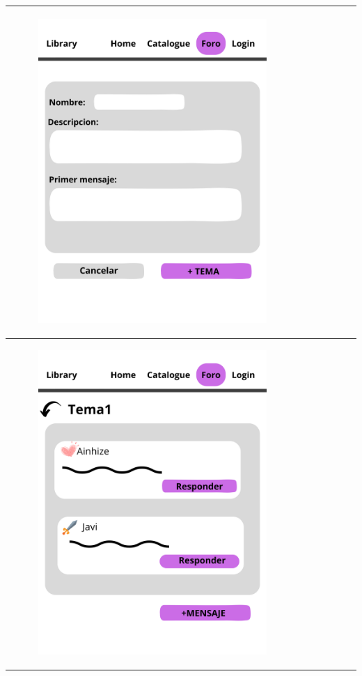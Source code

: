 \documentclass{report}
\begin{document}
\begin{center}
\begin{longtable}{|p{\linewidth}|}
\begin{figure}[H]
                            \includegraphics[width=0.8\textwidth]{./img/grafico/Foro3.png}
                        \end{figure}\\
                        \hline
                        \begin{figure}[H]
                            \centering
                            \includegraphics[width=0.8\textwidth]{./img/grafico/Foro4.png}
                        \end{figure}\\
                        \hline
                    \end{longtable}
                \end{center}
\end{document}
